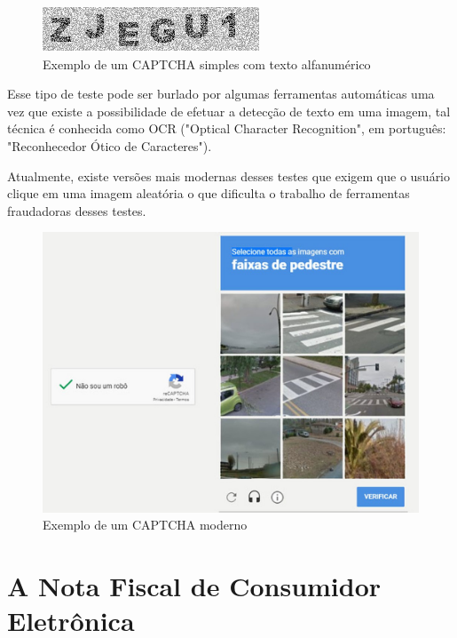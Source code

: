 \begin{figure}[h]
    \centering
    \includegraphics[scale=0.5]{tcc/figures/captcha/captcha-alfanumerico.png}
    \caption{Exemplo de um CAPTCHA simples com texto alfanumérico}
    \label{fig-exemplo-captcha-alfanumerico}
\end{figure}

Esse tipo de teste pode ser burlado por algumas ferramentas automáticas uma vez que existe a possibilidade de efetuar a detecção de texto em uma imagem, tal técnica é conhecida como OCR ("Optical Character Recognition", em português: "Reconhecedor Ótico de Caracteres").

Atualmente, existe versões mais modernas desses testes que exigem que o usuário clique em uma imagem aleatória o que dificulta o trabalho de ferramentas fraudadoras desses testes.

\begin{figure}[h]
    \centering
    \includegraphics[scale=0.15]{tcc/figures/captcha/recaptcha-post-g1.jpg}
    \caption{Exemplo de um CAPTCHA moderno}
    \label{fig-exemplo-captcha-alfanumerico}
\end{figure}

\section{A Nota Fiscal de Consumidor Eletrônica}\label{secNfce}

